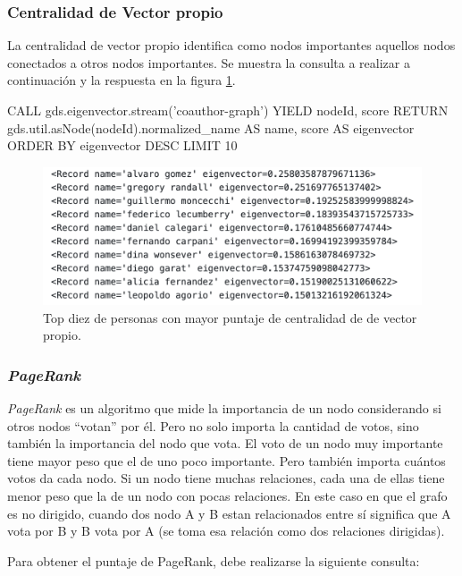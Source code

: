 \documentclass[journal]{IEEEtran}
\begin{document}
\subsubsection{Centralidad de Vector propio}
La centralidad de vector propio identifica como nodos importantes aquellos nodos conectados a otros nodos importantes. Se muestra la consulta a realizar a continuación y la respuesta en la figura \ref{fig:vector_propio}.
\begin{sflisting}[style=sparql,caption= Centralidad de Vector Propio,label=codigo2]
	CALL gds.eigenvector.stream('coauthor-graph')
	YIELD nodeId, score
	RETURN gds.util.asNode(nodeId).normalized_name
	AS name, score AS eigenvector
	ORDER BY eigenvector DESC
	LIMIT 10
\end{sflisting}

\begin{figure}[t]
	\centering
	\includegraphics[width=\linewidth]{imagenes/eigenvector.png}
	\caption{Top diez de personas con mayor puntaje de centralidad de de vector propio.}
	\label{fig:vector_propio}
\end{figure}

\subsubsection{\textit{PageRank}}
\textit{PageRank} es un algoritmo que mide la importancia de un nodo considerando si otros nodos ``votan'' por él. Pero no solo importa la cantidad de votos, sino también la importancia del nodo que vota. El voto de un nodo muy importante tiene mayor peso que el de uno poco importante. Pero también importa cuántos votos da cada nodo. Si un nodo tiene muchas relaciones, cada una de ellas tiene menor peso que la de un nodo con pocas relaciones. En este caso en que el grafo es no dirigido, cuando dos nodo A y B estan relacionados entre sí significa que A vota por B y B vota por A (se toma esa relación como dos relaciones dirigidas).

Para obtener el puntaje de PageRank, debe realizarse la siguiente consulta:
\end{document}
